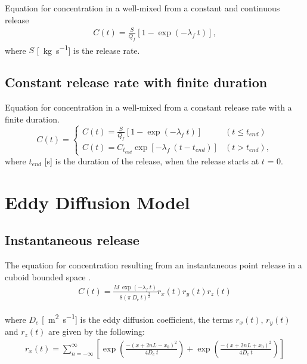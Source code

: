 \documentclass[]{article}
\begin{document}
Equation for concentration in a well-mixed from a constant and continuous
release \cite{keil09}
\begin{eqnarray}\label{eq:WMCont}
	C(t) = \frac{S}{Q_f} \left[1 - \exp\left( -\lambda_f\:t\right) \right],
\end{eqnarray}
where $S$ [\SI{}{\kilo\gram\per\second}] is the release rate. 

\subsection{Constant release rate with finite duration}\label{sec:WMFinite}

Equation for concentration in a well-mixed from a constant release rate with a
finite duration.
\begin{equation}\label{eq:WMFinite}
	C(t) = 
	\begin{cases} 
		C(t) = \frac{S}{Q_f} \left[1 - \exp\left( -\lambda_f\:t\right) \right]								& (t \leq t_{end}) \\
		C(t) = C_{t_{end}} \exp\left[-\lambda_f\:(t - t_{end})\right]											& (t > t_{end}),
	\end{cases} 
\end{equation}
where $t_{end}$ [s] is the duration of the release, when the release starts at
$t$ = 0.

\section{Eddy Diffusion Model}\label{app:eddydiff}

\subsection{Instantaneous release}\label{app:EddyInst}

The equation for concentration resulting from an instantaneous point release in
a cuboid bounded space \cite{drivas96}.
\begin{eqnarray}\label{eq:cuboid-decay-inst}
	C(t) = \frac{M\: \exp(-\lambda_f\:t)}{8(\pi\:D_e\:t)^{\frac{3}{2}}} r_{x}(t)
	r_{y}(t) r_{z}(t)
\end{eqnarray}

where $D_e$ [\SI{}{\meter\squared\per\second}] is the eddy diffusion
coefficient, the terms $r_{x}(t)$, $r_{y}(t)$ and $r_{z}(t)$ are given by the
following:
\begin{eqnarray}
	r_{x}(t) = \sum^{\infty}_{n = -\infty} \left[\exp\left(\frac{-(x + 2nL -
	x_{0})^{2}}{4D_e\:t}\right) + \exp\left(\frac{-(x + 2nL +
	x_{0})^{2}}{4D_e\:t}\right)\right]
\end{eqnarray}
\end{document}

